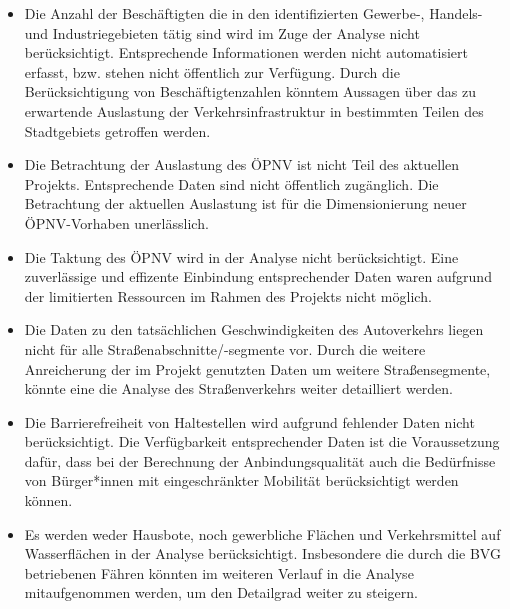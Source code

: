 \begin{itemize}

    \item Die Anzahl der Beschäftigten die in den identifizierten Gewerbe-, Handels- und Industriegebieten tätig sind wird im Zuge der Analyse nicht berücksichtigt. Entsprechende Informationen werden nicht automatisiert erfasst, bzw. stehen nicht öffentlich zur Verfügung. Durch die Berücksichtigung von Beschäftigtenzahlen könntem Aussagen über das zu erwartende Auslastung der Verkehrsinfrastruktur in bestimmten Teilen des Stadtgebiets getroffen werden. 
        
    \item Die Betrachtung der Auslastung des ÖPNV ist nicht Teil des aktuellen Projekts. Entsprechende Daten sind nicht öffentlich zugänglich. Die Betrachtung der aktuellen Auslastung ist für die Dimensionierung neuer ÖPNV-Vorhaben unerlässlich. 
    
    \item Die Taktung des ÖPNV wird in der Analyse nicht berücksichtigt​. Eine zuverlässige und effizente Einbindung entsprechender Daten waren aufgrund der limitierten Ressourcen im Rahmen des Projekts nicht möglich.
    
    \item Die Daten zu den tatsächlichen Geschwindigkeiten des Autoverkehrs liegen nicht für alle Straßenabschnitte/-segmente vor​. Durch die weitere Anreicherung der im Projekt genutzten Daten um weitere Straßensegmente, könnte eine die Analyse des Straßenverkehrs weiter detailliert werden. 
    
    \item Die Barrierefreiheit von Haltestellen wird aufgrund fehlender Daten nicht berücksichtigt​. Die Verfügbarkeit entsprechender Daten ist die Voraussetzung dafür, dass bei der Berechnung der Anbindungsqualität auch die Bedürfnisse von Bürger*innen mit eingeschränkter Mobilität berücksichtigt werden können.
    
    \item Es werden weder Hausbote, noch gewerbliche Flächen und Verkehrsmittel auf Wasserflächen in der Analyse berücksichtigt. Insbesondere die durch die BVG betriebenen Fähren könnten im weiteren Verlauf in die Analyse mitaufgenommen werden, um den Detailgrad weiter zu steigern.
    
\end{itemize}


